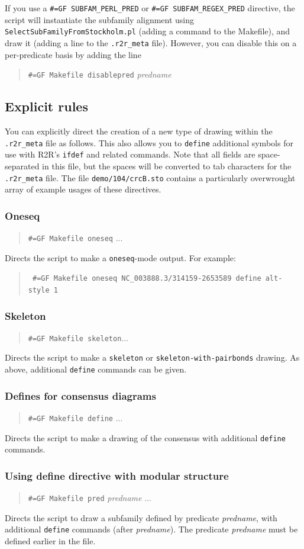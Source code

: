 \documentclass[letterpaper,12pt]{report}
\newcommand{\example}[1]{
\begin{quote}
{\raggedright
#1
}
\end{quote}
}
\newcommand{\examplett}[1]{
\example{{\tt #1}}
}
\begin{document}
If you use a {\tt \#=GF SUBFAM\_PERL\_PRED} or {\tt \#=GF SUBFAM\_REGEX\_PRED} directive,
the script will instantiate the subfamily alignment using {\tt SelectSubFamilyFromStockholm.pl} (adding a command
to the Makefile),
and draw it (adding a line to the {\tt .r2r\_meta} file).
However, you can disable this on a per-predicate basis by adding the line
\example{
{\tt \#=GF Makefile disablepred} {\it predname}
}

\subsection{Explicit rules}

You can explicitly direct the creation of a new type of drawing within the {\tt .r2r\_meta} file as follows.
This also allows you to {\tt define} additional symbols for use with R2R's {\tt ifdef} and related commands.
Note that all fields are space-separated in this file, but the spaces will be converted to tab characters
for the {\tt .r2r\_meta} file.
The file {\tt demo/104/crcB.sto} contains a particularly overwrought array of example usages
of these directives.

\subsubsection{Oneseq}

\example{
{\tt \#=GF Makefile oneseq} ...
}
Directs the script to make a {\tt oneseq}-mode output.  For example:
\examplett{
\#=GF Makefile oneseq NC\_003888.3/314159-2653589 define alt-style 1
}

\subsubsection{Skeleton}

\example{
{\tt \#=GF Makefile skeleton}...
}
Directs the script to make a {\tt skeleton} or {\tt skeleton-with-pairbonds} drawing.
As above, additional {\tt define} commands can be given.

\subsubsection{Defines for consensus diagrams}

\example{
{\tt \#=GF Makefile define} ...
}
Directs the script to make a drawing of the consensus with additional {\tt define} commands.

\subsubsection{Using define directive with modular structure}
\example{
{\tt \#=GF Makefile pred} {\it predname} ...
}
Directs the script to draw a subfamily defined by predicate {\it predname}, with additional {\tt define} commands (after {\it predname}).
The predicate {\it predname} must be defined earlier in the file.
\end{document}
